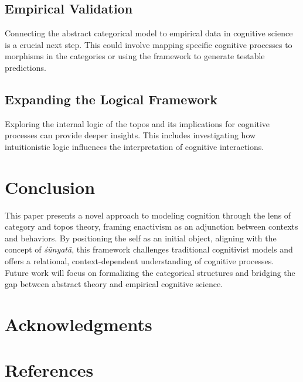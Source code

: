 \documentclass{article}
\begin{document}
\subsection{Empirical Validation}

Connecting the abstract categorical model to empirical data in cognitive science is a crucial next step. This could involve mapping specific cognitive processes to morphisms in the categories or using the framework to generate testable predictions.

\subsection{Expanding the Logical Framework}

Exploring the internal logic of the topos and its implications for cognitive processes can provide deeper insights. This includes investigating how intuitionistic logic influences the interpretation of cognitive interactions.

\section{Conclusion}

This paper presents a novel approach to modeling cognition through the lens of category and topos theory, framing enactivism as an adjunction between contexts and behaviors. By positioning the self as an initial object, aligning with the concept of \emph{śūnyatā}, this framework challenges traditional cognitivist models and offers a relational, context-dependent understanding of cognitive processes. Future work will focus on formalizing the categorical structures and bridging the gap between abstract theory and empirical cognitive science.

\section*{Acknowledgments}


\section*{References}
\end{document}
